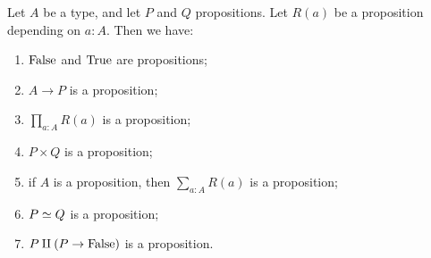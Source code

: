 \begin{lemma}\label{lem:prop-utils}
Let $A$ be a type, and let $P$ and $Q$ propositions.
Let $R(a)$ be a proposition depending on $a:A$. Then we have:
\begin{enumerate}
\item\label{prop-utils-false-true} $\mathrm{False}$ and $\mathrm{True}$ are propositions;
\item\label{prop-utils-codom} $A\to P$ is a proposition;
\item\label{prop-utils-pi} $\prod_{a:A} R(a)$ is a proposition;
\item\label{prop-utils-times} $P\times Q$ is a proposition;
\item\label{prop-utils-sum} if $A$ is a proposition, then $\sum_{a:A} R(a)$ is a proposition;
\item\label{prop-utils-eq} $P \simeq Q$ is a proposition;
\item\label{prop-utils-lem} $P \amalg (P\to\mathrm{False})$ is a proposition.
\end{enumerate}
\end{lemma}

